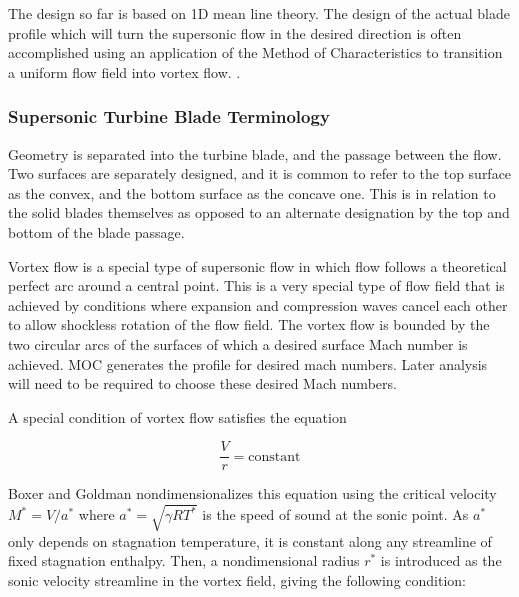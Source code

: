 The design so far is based on 1D mean line theory. The design of the actual blade profile which will turn the supersonic flow in the desired direction is often accomplished using an application of the Method of Characteristics to transition a uniform flow field into vortex flow. . 

\subsubsection{Supersonic Turbine Blade Terminology}

Geometry is separated into the turbine blade, and the passage between the flow. Two surfaces are separately designed, and it is common to refer to the top surface as the convex, and the bottom surface as the concave one. This is in relation to the solid blades themselves as opposed to an alternate designation by the top and bottom of the blade passage.

Vortex flow is a special type of supersonic flow in which flow follows a theoretical perfect arc around a central point. This is a very special type of flow field that is achieved by conditions where expansion and compression waves cancel each other to allow shockless rotation of the flow field. The vortex flow is bounded by the two circular arcs of the surfaces of which a desired surface Mach number is achieved. MOC generates the profile for desired mach numbers. Later analysis will need to be required to choose these desired Mach numbers.

A special condition of vortex flow satisfies the equation

\begin{equation}
    \frac{V}{r} = \textrm{constant}
    \label{eq:vortex_condition}
\end{equation}

Boxer and Goldman nondimensionalizes this equation using the critical velocity $M^{*}=V/a^*$ where $a^*=\sqrt{\gamma R T^*}$ is the speed of sound at the sonic point. As $a^*$ only depends on stagnation temperature, it is constant along any streamline of fixed stagnation enthalpy. Then, a nondimensional radius $r^*$ is introduced as the sonic velocity streamline in the vortex field, giving the following condition:

